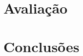 \documentclass[doutorado, pre-defesa, spanish, english, brazil]{packages/icmc}
\begin{document}
\chapter{Avaliação}\label{chapter:avaliacao}


\chapter{Conclusões}\label{chapter:conclusoes}




% 

\postextual




%

\end{document}
